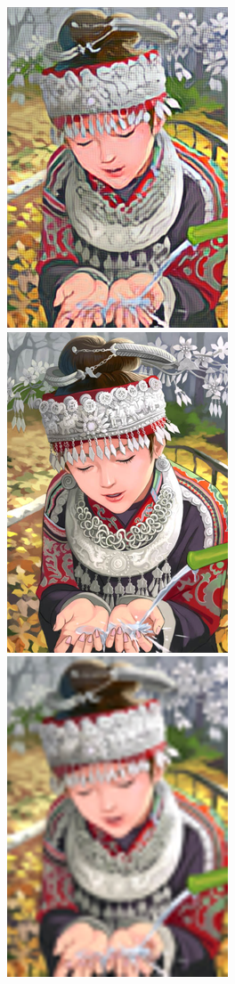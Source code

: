 \documentclass[runningheads]{llncs}
\begin{document}
\begin{figure}[t]
  \includegraphics[width=\mywidth]{set14_5_feat.png} \\
  \includegraphics[trim={30px 200px 50px 100px},clip,width=\mywidth]{set14_5_orig.png}
  \includegraphics[trim={30px 200px 50px 100px},clip,width=\mywidth]{set14_5_bicubic.png}

\end{figure}
\end{document}
